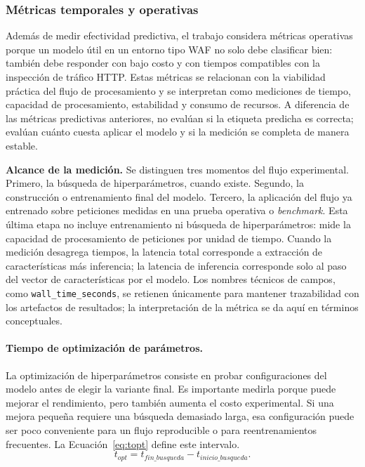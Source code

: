 \documentclass[12pt,oneside]{report}
\begin{document}
\subsubsection{Métricas temporales y operativas}

Además de medir efectividad predictiva, el trabajo considera métricas operativas porque un modelo útil en un entorno tipo WAF no solo debe clasificar bien: también debe responder con bajo costo y con tiempos compatibles con la inspección de tráfico HTTP. Estas métricas se relacionan con la viabilidad práctica del flujo de procesamiento y se interpretan como mediciones de tiempo, capacidad de procesamiento, estabilidad y consumo de recursos. A diferencia de las métricas predictivas anteriores, no evalúan si la etiqueta predicha es correcta; evalúan cuánto cuesta aplicar el modelo y si la medición se completa de manera estable.

\textbf{Alcance de la medición.} Se distinguen tres momentos del flujo experimental. Primero, la búsqueda de hiperparámetros, cuando existe. Segundo, la construcción o entrenamiento final del modelo. Tercero, la aplicación del flujo ya entrenado sobre peticiones medidas en una prueba operativa o \emph{benchmark}. Esta última etapa no incluye entrenamiento ni búsqueda de hiperparámetros: mide la capacidad de procesamiento de peticiones por unidad de tiempo. Cuando la medición desagrega tiempos, la latencia total corresponde a extracción de características más inferencia; la latencia de inferencia corresponde solo al paso del vector de características por el modelo. Los nombres técnicos de campos, como \texttt{wall\_time\_seconds}, se retienen únicamente para mantener trazabilidad con los artefactos de resultados; la interpretación de la métrica se da aquí en términos conceptuales.

\paragraph{Tiempo de optimización de parámetros.}
La optimización de hiperparámetros consiste en probar configuraciones del modelo antes de elegir la variante final. Es importante medirla porque puede mejorar el rendimiento, pero también aumenta el costo experimental. Si una mejora pequeña requiere una búsqueda demasiado larga, esa configuración puede ser poco conveniente para un flujo reproducible o para reentrenamientos frecuentes. La Ecuación~\eqref{eq:topt} define este intervalo.
\begin{equation}
\label{eq:topt}
t_{opt}=t_{fin\_busqueda}-t_{inicio\_busqueda}.
\end{equation}
\end{document}
